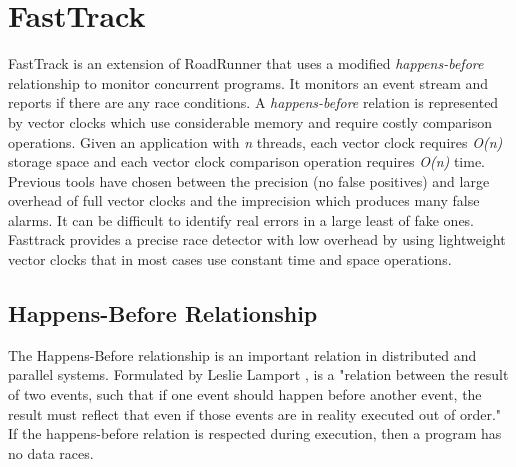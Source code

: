 \documentclass{acm_proc_article-sp}
\begin{document}
\section{FastTrack}
FastTrack is an extension of RoadRunner that uses a modified \emph{happens-before} relationship to monitor concurrent programs. It monitors an event stream and reports if there are any race conditions. A \emph{happens-before} relation is represented by vector clocks \cite{citeulike} which use considerable memory and require costly comparison operations. Given an application with  \emph{n} threads, each vector clock requires \emph{O(n)} storage space and each vector clock comparison operation requires \emph{O(n)} time. Previous tools have chosen between the precision (no false positives) and large overhead of full vector clocks and the imprecision which produces many false alarms. It can be difficult to identify real errors in a large least of fake ones. Fasttrack provides a precise race detector with low overhead by using lightweight vector clocks that in most cases use constant time and space operations.

\subsection{Happens-Before Relationship}
The Happens-Before relationship is an important relation in distributed and parallel systems. Formulated by Leslie Lamport \cite{Lamport1978}, is a "relation between the result of two events, such that if one event should happen before another event, the result must reflect that even if those events are in reality executed out of order." If the happens-before relation is respected during execution, then a program has no data races.
\end{document}
